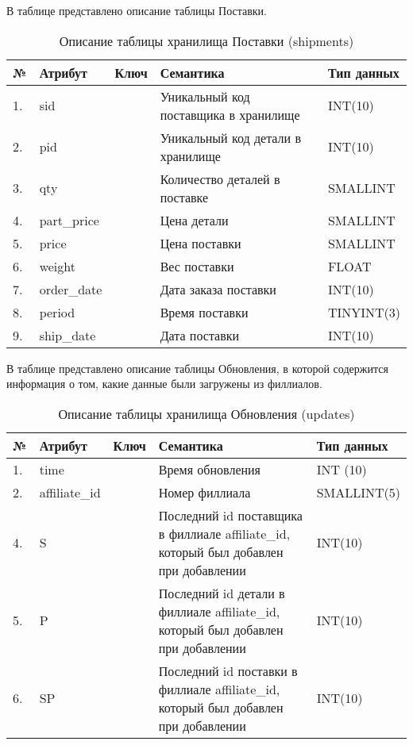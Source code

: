 В таблице  представлено описание таблицы Поставки.
\begin{table}[h]
	\caption{\space Описание таблицы хранилища Поставки (shipments)}
	\label{etl-shipments}
	\begin{tabular}{|p{0.4cm}|p{2.5cm}|p{1.5cm}|p{6.3cm}|p{3.2cm}|}
		\hline
		\textbf{№} & \textbf{Атрибут} & \textbf{Ключ} & \textbf{Семантика} & \textbf{Тип данных} \\
		\hline
		1. & sid & & Уникальный код поставщика в хранилище & INT(10) \\
		\hline
		2. & pid & & Уникальный код детали в хранилище & INT(10) \\
		\hline
		3. & qty & & Количество деталей в поставке & SMALLINT \\
		\hline
		4. & part\_price & & Цена детали & SMALLINT \\
		\hline
		5. & price & & Цена поставки & SMALLINT \\
		\hline
		6. & weight & & Вес поставки & FLOAT \\
		\hline
		7. & order\_date & & Дата заказа поставки & INT(10) \\
		\hline
		8. & period & & Время поставки & TINYINT(3) \\
		\hline
		9. & ship\_date & & Дата поставки & INT(10) \\
		\hline
	\end{tabular}
\end{table}

В таблице  представлено описание таблицы Обновления, в которой содержится информация о том, какие данные были загружены из филлиалов.
\begin{table}[h]
	\caption{\space Описание таблицы хранилища Обновления (updates)}
	\label{etl-updates}
	\begin{tabular}{|p{0.4cm}|p{2.5cm}|p{1.5cm}|p{6.3cm}|p{3.2cm}|}
		\hline
		\textbf{№} & \textbf{Атрибут} & \textbf{Ключ} & \textbf{Семантика} & \textbf{Тип данных} \\
		\hline
		1. & time & & Время обновления & INT (10) \\
		\hline
		2. & affiliate\_id & & Номер филлиала & SMALLINT(5) \\
		\hline
		4. & S & & Последний id поставщика в филлиале affiliate\_id, который был добавлен при добавлении & INT(10) \\
		\hline
		5. & P & & Последний id детали в филлиале affiliate\_id, который был добавлен при добавлении & INT(10) \\
		\hline
		6. & SP & & Последний id поставки в филлиале affiliate\_id, который был добавлен при добавлении & INT(10) \\
		\hline
	\end{tabular}
\end{table}

